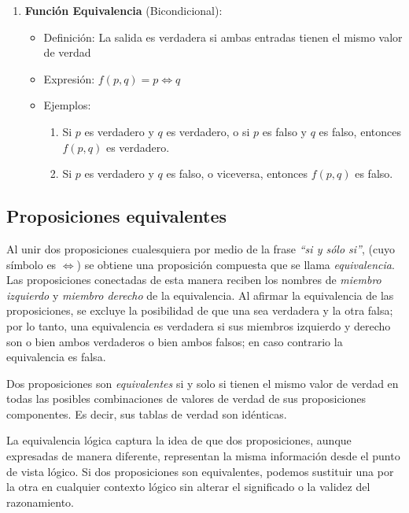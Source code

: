 \begin{enumerate}
	\item \textbf{Función Equivalencia} (Bicondicional):
	\begin{itemize}
		\item Definición: La salida es verdadera si ambas entradas tienen el mismo valor de verdad
		\item Expresión: \( f(p, q) = p \iff q  \)
		\item Ejemplos:
		\begin{enumerate}
			\item Si $p$ es verdadero y $q$ es verdadero, o si $p$ es falso y $q$ es falso, entonces $f(p, q)$ es verdadero.
			\item Si $p$ es verdadero y $q$ es falso, o viceversa, entonces $f(p, q)$ es falso.
		\end{enumerate}
	\end{itemize}
\end{enumerate}

\subsection{Proposiciones equivalentes}

Al unir dos proposiciones cualesquiera por medio de la frase \textit{``si y sólo si''}, (cuyo símbolo es \( \iff \)) se obtiene una proposición compuesta que se llama \textit{equivalencia}. Las proposiciones conectadas de esta manera reciben los nombres de \textit{miembro izquierdo} y \textit{miembro derecho} de la equivalencia. Al afirmar la equivalencia de las proposiciones, se excluye la posibilidad de que una sea verdadera y la otra falsa; por lo tanto, una equivalencia es verdadera si sus miembros izquierdo y derecho son o bien ambos verdaderos o bien ambos falsos; en caso contrario la equivalencia es falsa.

Dos proposiciones son \textit{equivalentes} si y solo si tienen el mismo valor de verdad en todas las posibles combinaciones de valores de verdad de sus proposiciones componentes. Es decir, sus tablas de verdad son idénticas.

La equivalencia lógica captura la idea de que dos proposiciones, aunque expresadas de manera diferente, representan la misma información desde el punto de vista lógico. Si dos proposiciones son equivalentes, podemos sustituir una por la otra en cualquier contexto lógico sin alterar el significado o la validez del razonamiento.

